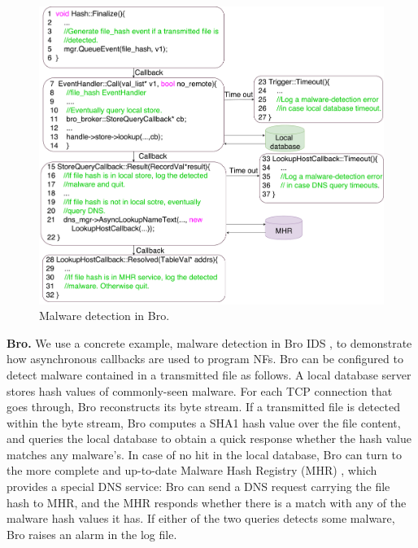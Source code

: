 \begin{figure}[!h]
\centering
\includegraphics[width=\columnwidth]{chap-netstar/figure/ids_process_loop.pdf}
\caption{Malware detection in Bro.}
\label{fig:code-sample}
\end{figure}

\noindent\textbf{Bro.} We use a concrete example, malware detection in Bro IDS \cite{bro}, to demonstrate how asynchronous callbacks are used to program NFs. Bro can be configured to detect malware contained in a transmitted file as follows. %
 A local database server %
 stores hash values of commonly-seen malware. For each TCP connection that goes through, Bro reconstructs its byte stream. %
 If a transmitted file is detected within the byte stream, Bro computes a SHA1 hash value over the file content, and queries the local database to obtain a quick response whether the hash value matches any malware's. In case of no hit in the local database, Bro can turn to the more complete and up-to-date Malware Hash Registry (MHR) \cite{MHR}, which provides a special DNS service: Bro can send a DNS request carrying the file hash to MHR, and the MHR responds whether there is a match with any of the malware hash values it has. If either of the two queries detects some malware, Bro raises an alarm in the log file.


